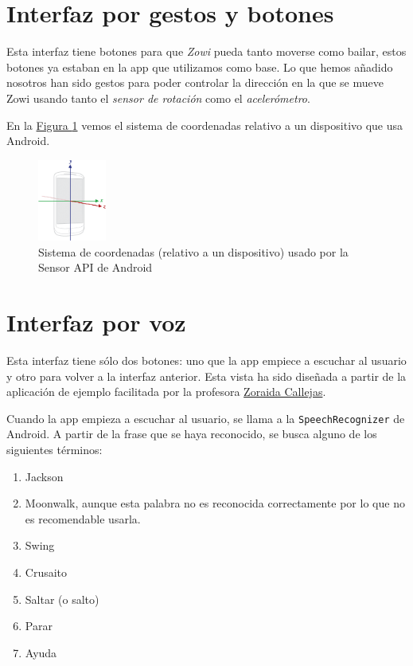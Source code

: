 \documentclass[10pt,a4paper,spanish]{article}
\begin{document}
\section{\textcolor{denim}Interfaz por gestos y botones}
Esta interfaz tiene botones para que \textit{\textcolor{denim}{Zowi}} pueda tanto moverse como bailar, estos botones ya estaban en la app que utilizamos como base. Lo que hemos añadido nosotros han sido gestos para poder controlar la dirección en la que se mueve Zowi usando tanto el \textit{\textcolor{denim}{sensor de rotación}} como el \textit{\textcolor{denim}{acelerómetro}}.

En la \hyperref[axis]{Figura \ref*{axis}} vemos el sistema de coordenadas relativo a un dispositivo que usa Android.

\begin{figure}[!h]
    \centering
    \includegraphics[width=0.2\textwidth]{axis_device}
    \caption{Sistema de coordenadas (relativo a un dispositivo) usado por la Sensor API de Android}
    \label{axis}
\end{figure}

\section{\textcolor{denim}Interfaz por voz}
Esta interfaz tiene sólo dos botones: uno que la app empiece a escuchar al usuario y otro para volver a la interfaz anterior. Esta vista ha sido diseñada a partir de la aplicación de ejemplo facilitada por la profesora \href{https://github.com/zoraidacallejas}{Zoraida Callejas}.

Cuando la app empieza a escuchar al usuario, se llama a la \texttt{\textcolor{denim}{SpeechRecognizer}} de Android. A partir de la frase que se haya reconocido, se busca alguno de los siguientes términos:

\begin{enumerate}[\qquad\ \color{denim}{$\bullet$}]
    \item Jackson
    \item Moonwalk, aunque esta palabra no es reconocida correctamente por lo que no es recomendable usarla.
    \item Swing
    \item Crusaito
    \item Saltar (o salto)
    \item Parar
    \item Ayuda
\end{enumerate}
\end{document}
